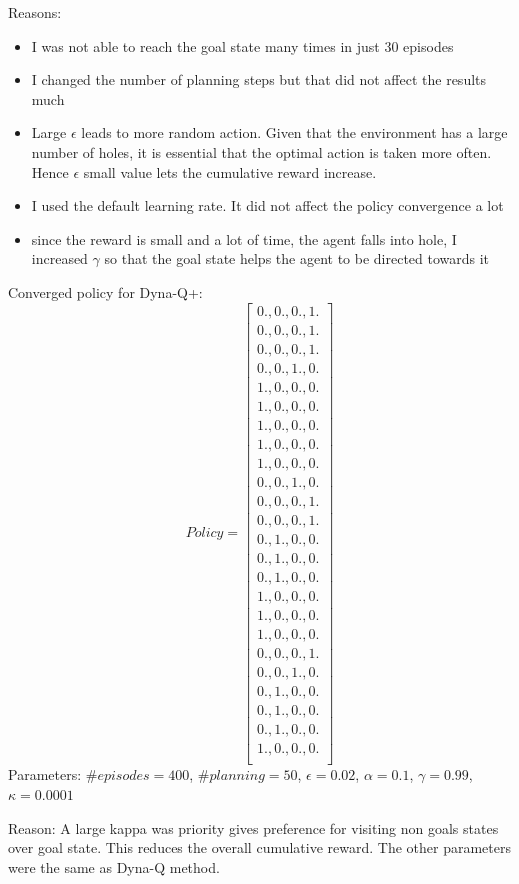 \documentclass[12pt]{article}
\newenvironment{problem}[2][\large Problem]{\begin{trivlist}
\item[\hskip \labelsep {\bfseries #1}\hskip \labelsep {\bfseries #2.}]}{\end{trivlist}}
\begin{document}
\begin{problem} {1}
Reasons:
\vspace{-4mm} 
\begin{itemize}
	\item I was not able to reach the goal state many times in just 30 episodes
	\item I changed the number of planning steps but that did not affect the results much
	\item Large $\epsilon$ leads to more random action. Given that the environment has a large number of holes, it is essential that the optimal action is taken more often. Hence $\epsilon$ small value lets the cumulative reward increase.
	\item I used the default learning rate. It did not affect the policy convergence a lot
	\item since the reward is small and a lot of time, the agent falls into hole, I increased $\gamma$ so that the goal state helps the agent to be directed towards it 
\end{itemize}

Converged policy for Dyna-Q+:
$$ Policy = \begin{bmatrix} 
 0.,  0.,  0.,  1.\\
 0.,  0.,  0.,  1.\\
 0.,  0.,  0.,  1.\\
 0.,  0.,  1.,  0.\\
 1.,  0.,  0.,  0.\\
 1.,  0.,  0.,  0.\\
 1.,  0.,  0.,  0.\\
 1.,  0.,  0.,  0.\\
 1.,  0.,  0.,  0.\\
 0.,  0.,  1.,  0.\\
 0.,  0.,  0.,  1.\\
 0.,  0.,  0.,  1.\\
 0.,  1.,  0.,  0.\\
 0.,  1.,  0.,  0.\\
 0.,  1.,  0.,  0.\\
 1.,  0.,  0.,  0.\\
 1.,  0.,  0.,  0.\\
 1.,  0.,  0.,  0.\\
 0.,  0.,  0.,  1.\\
 0.,  0.,  1.,  0.\\
 0.,  1.,  0.,  0.\\
 0.,  1.,  0.,  0.\\
 0.,  1.,  0.,  0.\\
 1.,  0.,  0.,  0.\\
\end{bmatrix} $$ 
Parameters: $\#episodes = 400$, $\#planning = 50$, $\epsilon = 0.02$,
$\alpha = 0.1$, $\gamma = 0.99$, $\kappa = 0.0001$

Reason: A large kappa was priority gives preference for visiting non goals states over goal state. This reduces the overall cumulative reward. The other parameters were the same as Dyna-Q method. 



\end{problem}
\newpage
\end{document}
